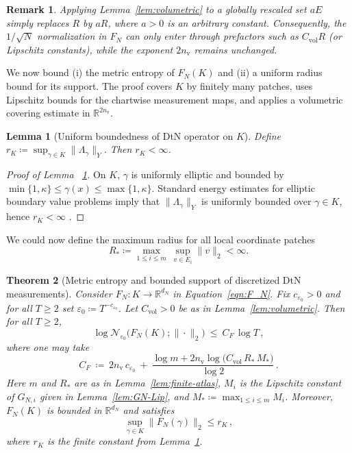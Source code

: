 \documentclass{article}
\def\Eqref#1{Equation~\ref{#1}}
\newcommand{\R}{\mathbb{R}}
\newtheorem{theorem}{Theorem}[section]
\newtheorem{lemma}[theorem]{Lemma}
\newtheorem{remark}{Remark}[section]
\begin{document}
\begin{remark}
Applying Lemma~\ref{lem:volumetric} to a globally rescaled set $aE$ simply replaces $R$ by $aR$, where $a>0$ is an arbitrary constant. Consequently, the $1/\sqrt{N}$ normalization in $F_N$ can only enter through prefactors such as
$C_{\mathrm{vol}}R$ (or Lipschitz constants), while the exponent $2n_{\mathrm v}$ remains unchanged.
\end{remark}

We now bound (i) the metric entropy of $F_N(K)$ and (ii) a uniform radius bound for its support.
The proof covers $K$ by finitely many patches, uses Lipschitz bounds for the chartwise measurement maps,
and applies a volumetric covering estimate in $\R^{2n_{\mathrm v}}$.

\begin{lemma}[Uniform boundedness of DtN operator on $K$]\label{lem:DtN-bdd}
Define \(r_K \coloneqq  \sup_{\gamma\in K}\|\Lambda_\gamma\|_Y\). Then \(r_K<\infty\).
\end{lemma}

\begin{proof}[Proof of Lemma ~\ref{lem:DtN-bdd}]
On $K$, $\gamma$ is uniformly elliptic and bounded by
$\min\{1,\kappa\}\le \gamma(x)\le \max\{1,\kappa\}$.
Standard energy estimates for elliptic boundary value problems imply that
$\|\Lambda_\gamma\|_Y$ is uniformly bounded over $\gamma\in K$, hence $r_K<\infty$ \citep{evans2022partial}.
\end{proof}

We could now define the maximum radius for all local coordinate patches
\begin{equation}\label{eq:Rstar_poly}
R_*\coloneqq \max_{1\le i\le m}\ \sup_{v\in E_i}\|v\|_2<\infty.
\end{equation}
\begin{theorem}[Metric entropy and bounded support of discretized DtN measurements]\label{thm:FN-main}
Consider $F_N:K\to\R^{d_N}$ in \Eqref{eqn:F_N}. Fix $c_{\varepsilon_0}>0$ and for all $T\ge 2$ set
$\varepsilon_0\coloneqq T^{-c_{\varepsilon_0}}$.
Let $C_{\mathrm{vol}}>0$ be as in Lemma~\ref{lem:volumetric}. Then for all $T\ge 2$,
\begin{equation}\label{eq:entropy-FNK}
\log \mathcal{N}_{\varepsilon_0}\big(F_N(K);\|\cdot\|_2\big)\ \le\ C_F\,\log T \,,
\end{equation}
where one may take
\begin{equation}\label{eq:CF}
C_F \ \coloneqq \ 2n_{\mathrm v}\,c_{\varepsilon_0}\ +\ \frac{\log m + 2n_{\mathrm v}\log\!\big(C_{\mathrm{vol}}\,R_*\,M_*\big)}{\log 2}\,.
\end{equation}
Here $m$ and $R_*$ are as in Lemma~\ref{lem:finite-atlas}, \(M_i\) is the Lipschitz constant of \(G_{N,i}\)
given in Lemma~\ref{lem:GN-Lip}, and \(M_*\coloneqq \max_{1\le i\le m} M_i\).
Moreover, $F_N(K)$ is bounded in $\R^{d_N}$ and satisfies
\[
\sup_{\gamma\in K}\|F_N(\gamma)\|_2 \le r_{K}\,,
\]
where \(r_K\) is the finite constant from Lemma~\ref{lem:DtN-bdd}.
\end{theorem}
\end{document}
